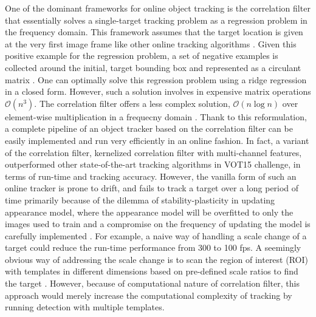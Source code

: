 \documentclass[10pt,twocolumn,letterpaper]{article}
\newcounter{ct}
\begin{document}
One of the dominant frameworks for online object tracking is the
correlation filter that essentially solves a single-target tracking
problem as a regression problem in the frequency domain. This
framework assumes that the target location is given at the very first
image frame like other online tracking algorithms
\cite{smeulders2014survey}. Given this positive example for the
regression problem, a set of negative examples is collected around the
initial, target bounding box and represented as a circulant matrix
\cite{henriques2015high}. One can optimally solve this regression
problem using a ridge regression in a closed form. However, such a
solution involves in expensive matrix operations
$\mathcal{O}(n^{3})$. The correlation filter offers a less complex
solution, $\mathcal{O}(n\log n)$ over element-wise multiplication in a
frequecny domain \cite{bolme2010visual,henriques2015high}. Thank to
this reformulation, a complete pipeline of an object tracker based on
the correlation filter can be easily implemented and run very
efficiently in an online fashion. In fact, a variant of the
correlation filter, kernelized correlation filter with multi-channel
features, outperformed other state-of-the-art tracking algorithms in
VOT15 challenge, in terms of run-time and tracking accuracy. However,
the vanilla form of such an online tracker is prone to drift, and
fails to track a target over a long period of time primarily
\cite{henriques2015high} because of the dilemma of
stability-plasticity in updating appearance model, where the
appearance model will be overfitted to only the images used to train
and a compromise on the frequency of updating the model is carefully
implemented \cite{santner2010prost}. For example, a naive way of
handling a scale change of a target could reduce the run-time
performance from 300 to 100 fps. A seemingly obvious way of addressing
the scale change is to scan the region of interest (ROI) with
templates in different dimensions based on pre-defined scale ratios to
find the target
\cite{henriques2015high,tang2015multi,ma2015long,bibi2015multi,li2014scale}. However,
because of computational nature of correlation filter, this approach
would merely increase the computational complexity of tracking by
running detection with multiple templates.
\end{document}
